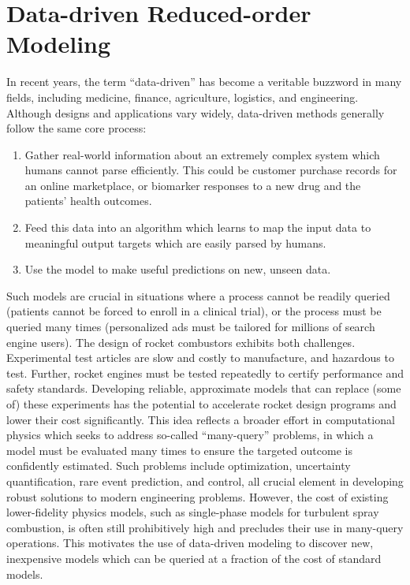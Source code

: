 \section{Data-driven Reduced-order Modeling}

In recent years, the term ``data-driven'' has become a veritable buzzword in many fields, including medicine, finance, agriculture, logistics, and engineering. Although designs and applications vary widely, data-driven methods generally follow the same core process:

\begin{enumerate}
    \item Gather real-world information about an extremely complex system which humans cannot parse efficiently. This could be customer purchase records for an online marketplace, or biomarker responses to a new drug and the patients' health outcomes.
    \item Feed this data into an algorithm which learns to map the input data to meaningful output targets which are easily parsed by humans.
    \item Use the model to make useful predictions on new, unseen data.
\end{enumerate}

Such models are crucial in situations where a process cannot be readily queried (patients cannot be forced to enroll in a clinical trial), or the process must be queried many times (personalized ads must be tailored for millions of search engine users). The design of rocket combustors exhibits both challenges. Experimental test articles are slow and costly to manufacture, and hazardous to test. Further, rocket engines must be tested repeatedly to certify performance and safety standards. Developing reliable, approximate models that can replace (some of) these experiments has the potential to accelerate rocket design programs and lower their cost significantly. This idea reflects a broader effort in computational physics which seeks to address so-called ``many-query'' problems, in which a model must be evaluated many times to ensure the targeted outcome is confidently estimated. Such problems include optimization, uncertainty quantification, rare event prediction, and control, all crucial element in developing robust solutions to modern engineering problems. However, the cost of existing lower-fidelity physics models, such as single-phase models for turbulent spray combustion, is often still prohibitively high and precludes their use in many-query operations. This motivates the use of data-driven modeling to discover new, inexpensive models which can be queried at a fraction of the cost of standard models.

